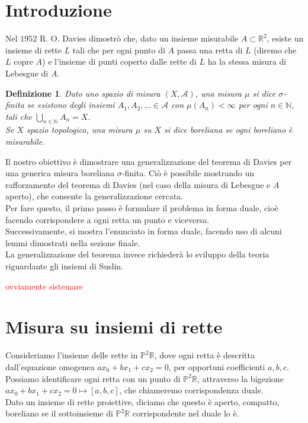 \documentclass[a4paper, twoside,openright]{article}
\newcommand{\R}{\mathbb{R}}
\newcommand{\N}{\mathbb{N}}
\renewcommand{\P}{\mathbb{P}}
\newcommand{\<}{\langle}
\renewcommand{\>}{\rangle}
\newtheorem{defin}[teo]{Definizione}
\begin{document}


\tableofcontents
\clearpage

\section{Introduzione}
	 Nel $1952$ R. O. Davies dimostrò che, dato un insieme misurabile $A \subset \mathbb{R}^{2}$, esiste un insieme di rette $L$ tali che per ogni punto di $A$ passa una retta di $L$ (diremo che $L$ copre $A$) e l'insieme di punti coperto dalle rette di $L$ ha la stessa misura di Lebesgue di $A$.\\
	 
	 \begin{defin}
	 	Dato uno spazio di misura $(X, \mathcal{A})$, una misura $\mu$ si dice $\sigma$-finita se esistono degli insiemi $A_{1},A_{2},\ldots \in {\mathcal {A}}$ con $\mu \left(A_{n}\right)<\infty $ per ogni $n \in \N$, tali che $\bigcup _{n\in \mathbb {N} }A_{n}=X$.\\
	 	Se $X$ spazio topologico, una misura $\mu$ su $X$ si dice boreliana se ogni boreliano è misurabile. 
	 \end{defin}	
 
	 Il nostro obiettivo è dimostrare una generalizzazione del teorema di Davies per una generica misura boreliana $\sigma$-finita.
	 Ciò è possibile mostrando un rafforzamento del teorema di Davies (nel caso della misura di Lebesgue e $A$ aperto), che consente la generalizzazione cercata.\\
	 Per fare questo, il primo passo è formulare il problema in forma duale, cioè facendo corrispondere a ogni retta un punto e viceversa.\\
	 Successivamente, si mostra l'enunciato in forma duale, facendo uso di alcuni lemmi dimostrati nella sezione finale.\\
	 La generalizzazione del teorema invece richiederà lo sviluppo della teoria riguardante gli insiemi di Suslin.
	
	\textcolor{red}{ovviamente sistemare}
	\newpage


\section{Misura su insiemi di rette}
Consideriamo l'insieme delle rette in $\P^2 \R$, dove ogni retta è descritta dall'equazione omogenea $ax_0+bx_1+cx_2=0$, per opportuni coefficienti $a,b,c$.\\
Possiamo identificare ogni retta con un punto di $\P^2 \R$, attraverso la bigezione $ax_0+bx_1+cx_2=0 \mapsto [a,b,c]$, che chiameremo corrispondenza duale.\\
Dato un insieme di rette proiettive, diciamo che questo è aperto, compatto, boreliano se il sottoinsieme di $\P^2 \R$ corrispondente nel duale lo è.\\
\end{document}
